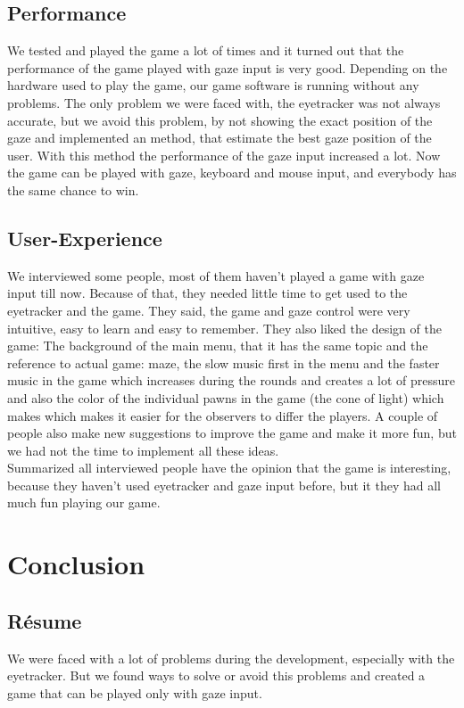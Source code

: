 \documentclass{sigchi}
\begin{document}
\subsection{Performance}
We tested and played the game a lot of times and it turned out that the performance of the game played with gaze input is very good. Depending on the hardware used to play the game, our game software is running without any problems. The only problem we were faced with, the eyetracker was not always accurate, but we avoid this problem, by not showing the exact position of the gaze and implemented an method, that estimate the best gaze position of the user. With this method the performance of the gaze input increased a lot. Now the game can be played with gaze, keyboard and mouse input, and everybody has the same chance to win.
\subsection{User-Experience}
We interviewed some people, most of them haven't played a game with gaze input till now. Because of that, they needed little time to get used to the eyetracker and the game. They said, the game and gaze control were very intuitive, easy to learn and easy to remember. They also liked the design of the game: The background of the main menu, that it has the same topic and the reference to actual game: maze, the slow music first in the menu and the faster music in the game which increases during the rounds and creates a lot of pressure and also the color of the individual pawns in the game (the cone of light) which makes which makes it easier for the observers to differ the players.
A couple of people also make new suggestions to improve the game and make it more fun, but we had not the time to implement all these ideas.\\
Summarized all interviewed people have the opinion that the game is interesting, because they haven't used eyetracker and gaze input before, but it they had all much fun playing our game. 

\section{Conclusion}
\subsection{R{\'e}sume}
We were faced with a lot of problems during the development, especially with the eyetracker. But we found ways to solve or avoid this problems and created a game that can be played only with gaze input.
\end{document}

